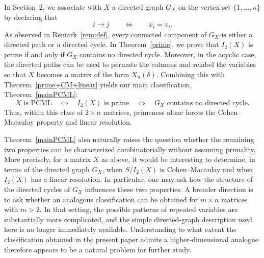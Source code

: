 \documentclass[12pt]{amsart}
\begin{document}
In Section~2, we associate with $X$ a directed graph $G_X$ on the
vertex set $\{1,\ldots,n\}$ by declaring that
\[
i\longrightarrow j
\qquad\Longleftrightarrow\qquad
x_i=z_j.
\]
As observed in Remark~\ref{rem:def}, every connected component of $G_X$ is either
a directed path or a directed cycle. In Theorem~\ref{prime}, we prove that
$I_2(X)$ is prime if and only if $G_X$ contains no directed cycle.
Moreover, in the acyclic case, the directed paths can be used to
permute the columns and relabel the variables so that $X$ becomes a
matrix of the form $X_n(\delta)$. Combining this with Theorem~\ref{prime+CM+linear}
yields our main classification, Theorem~\ref{mainPCML}:
\[
X\text{ is PCML}
\quad\Longleftrightarrow\quad
I_2(X)\text{ is prime}
\quad\Longleftrightarrow\quad
G_X\text{ contains no directed cycle}.
\]
Thus, within this class of $2\times n$ matrices, primeness alone forces
the Cohen--Macaulay property and linear resolution.

Theorem~\ref{mainPCML} also naturally raises the question whether the remaining two properties can be characterized combinatorially without assuming primality. More precisely, for a matrix $X$ as above, it would be interesting to determine, in terms of the directed graph $G_X$, when $S/I_2(X)$ is Cohen--Macaulay and when $I_2(X)$ has a linear resolution. In particular, one may ask how the structure of the directed cycles of $G_X$ influences these two properties. A broader direction is to ask whether an analogous classification can be obtained for $m\times n$ matrices with $m>2$. In that setting, the possible patterns of repeated variables are substantially more complicated, and the simple directed-graph description used here is no longer immediately available. Understanding to what extent the classification obtained in the present paper admits a higher-dimensional analogue therefore appears to be a natural problem for further study.




\end{document}
